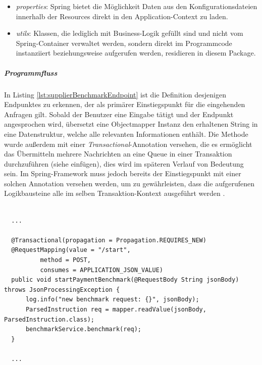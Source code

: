 \begin{itemize}
  \item \emph{properties}: Spring bietet die Möglichkeit Daten aus den Konfigurationsdateien innerhalb der Resources direkt in den Application-Context zu laden.
  
  \item \emph{utils}: Klassen, die lediglich mit Business-Logik gefüllt sind und nicht vom Spring-Container verwaltet werden, sondern direkt im Programmcode instanziiert beziehungsweise aufgerufen werden, residieren in diesem Package.

\end{itemize}


\subparagraph{Programmfluss}
In Listing \ref{lst:supplierBenchmarkEndpoint} ist die Definition desjenigen Endpunktes zu erkennen, der als primärer Einstiegspunkt für die eingehenden Anfragen gilt. Sobald der Benutzer eine Eingabe tätigt und der Endpunkt angesprochen wird, übersetzt eine Objectmapper Instanz den erhaltenen String in eine Datenstruktur, welche alle relevanten Informationen enthält. Die Methode wurde außerdem mit einer \emph{Transactional}-Annotation versehen, die es ermöglicht das Übermitteln mehrere Nachrichten an eine Queue in einer Transaktion durchzuführen (siehe  einfügen), dies wird im späteren Verlauf von Bedeutung sein. Im Spring-Framework muss jedoch bereits der Einstiegspunkt mit einer solchen Annotation versehen werden, um zu gewährleisten, dass die aufgerufenen Logikbausteine alle im selben Transaktion-Kontext ausgeführt werden .

\begin{lstlisting}[style=javaStyle,caption={Supplier - Endpunkt},label=lst:supplierBenchmarkEndpoint]

  ...

  @Transactional(propagation = Propagation.REQUIRES_NEW)
  @RequestMapping(value = "/start",
          method = POST,
          consumes = APPLICATION_JSON_VALUE)
  public void startPaymentBenchmark(@RequestBody String jsonBody) throws JsonProcessingException {
      log.info("new benchmark request: {}", jsonBody);
      ParsedInstruction req = mapper.readValue(jsonBody, ParsedInstruction.class);
      benchmarkService.benchmark(req);
  }

  ...
  
\end{lstlisting}




